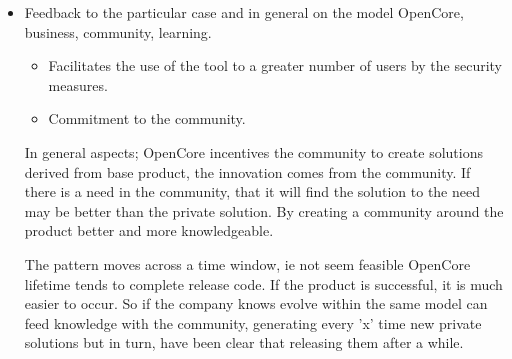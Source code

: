 \documentclass[11pt]{scrartcl}
\begin{document}
\begin{itemize}
\par The Metasploit community has grown around 25,000 users in 2009 to 125,000 in 2012 after buying the company. These are some very good numbers.

\par They use the private model to continue maintaining the free versions for the community.

\par They have an Open Source commitment\footnote{http://www.metasploit.com/about/open-source/} in which is included its aim to improve Open Source in distinct ways:

    \begin{itemize}
        \item Donate money to other FLOSS projects.
        \item Free source code from private versions to community versions.
    \end{itemize}

\item Feedback to the particular case and in general on the model OpenCore, business, community, learning.

\begin{itemize}
    \item Facilitates the use of the tool to a greater number of users by the security measures.
    \item Commitment to the community.
\end{itemize}

\par In general aspects; OpenCore incentives the community to create solutions derived from base product, the innovation comes from the community. If there is a need in the community, that it will find the solution to the need may be better than the private solution. By creating a community around the product better and more knowledgeable.

\par The pattern moves across a time window, ie not seem feasible OpenCore lifetime tends to complete release code. If the product is successful, it is much easier to occur. So if the company knows evolve within the same model can feed knowledge with the community, generating every 'x' time new private solutions but in turn, have been clear that releasing them after a while.

\end{itemize}
\end{document}
